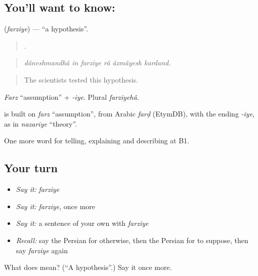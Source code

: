 \subsection*{You'll want to know: }
\textbf{} (\emph{farziye}) — \textquotedblleft{}a hypothesis\textquotedblright{}.

\begin{quote}
     .
\end{quote}

\begin{quote}
\emph{dâneshmandhâ in farziye râ âzmâyesh kardand.}
\end{quote}

\begin{quote}
The scientists tested this hypothesis.
\end{quote}

\emph{Farz} \textquotedblleft{}assumption\textquotedblright{} + \emph{-iye}. Plural \emph{farziyehâ}.

\begin{cousinweb}
\textbf{} is built on \emph{farz} \textquotedblleft{}assumption\textquotedblright{}, from Arabic \emph{farḍ} (EtymDB), with the ending \emph{-iye}, as in \emph{nazariye} \textquotedblleft{}theory\textquotedblright{}.
\end{cousinweb}

\begin{grammarlens}[title={What you've built}]
One more word for telling, explaining and describing at B1.
\end{grammarlens}

\subsection*{Your turn}
\begin{itemize}
\raggedright
  \item \emph{Say it:} \emph{farziye}
  \item \emph{Say it:} \emph{farziye}, once more
  \item \emph{Say it:} a sentence of your own with \emph{farziye}
  \item \emph{Recall:} say the Persian for otherwise, then the Persian for to suppose, then say \emph{farziye} again
\end{itemize}

\begin{tcolorbox}[breakable,colback=teal!4,colframe=teal!35!black,title={Before you move on}]
What does  mean? (\textquotedblleft{}A hypothesis\textquotedblright{}.) Say it once more.
\end{tcolorbox}
